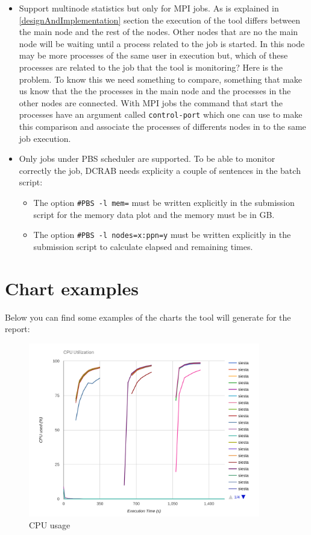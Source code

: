 \documentclass[10pt,a4paper]{report}
\begin{document}
\begin{itemize}
  \item Support multinode statistics but only for MPI jobs. As is explained in \ref{designAndImplementation} section the execution of the tool differs between the main node and the rest of the nodes. Other nodes that are no the main node will be waiting until a process related to the job is started. In this node may be more processes of the same user in execution but, which of these processes are related to the job that the tool is monitoring? Here is the problem. To know this we need something to compare, something that make us know that the the processes in the main node and the processes in the other nodes are connected. With MPI jobs the command that start the processes have an argument called \verb+control-port+ which one can use to make this comparison and associate the processes of differents nodes in to the same job execution.
  \item Only jobs under PBS scheduler are supported. To be able to monitor correctly the job, DCRAB needs explicity a couple of sentences in the batch script:
  \begin{itemize}
    \item The option \verb+#PBS -l mem=+ must be written explicitly in the submission script for the memory data plot and the memory must be in GB.
    \item The option \verb+#PBS -l nodes=x:ppn=y+ must be written explicitly in the submission script to calculate elapsed and remaining times.
  \end{itemize}
\end{itemize}

\section{Chart examples}

Below you can find some examples of the charts the tool will generate for the report:

\begin{figure}[h]
\centering
\includegraphics[width=0.9\textwidth]{img/cpu.png}
\caption{CPU usage}
\end{figure}
\end{document}
